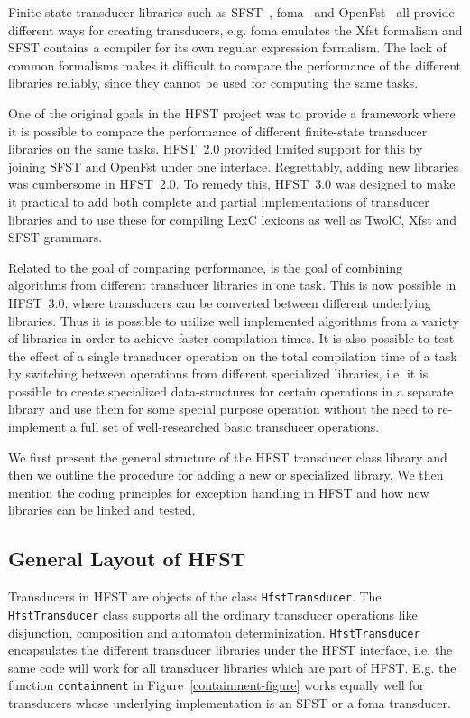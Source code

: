 \documentclass{llncs}
\begin{document}
Finite-state transducer libraries such as SFST~\cite{schmid/2005},
foma~\cite{hulden/2009} and OpenFst~\cite{openfst/2007} all provide
different ways for creating transducers, e.g. foma emulates the Xfst
formalism and SFST contains a compiler for its own regular expression
formalism. The lack of common formalisms makes it difficult to compare
the performance of the different libraries reliably, since they cannot
be used for computing the same tasks. 
 
One of the original goals in the HFST project was to provide a
framework where it is possible to compare the performance of different
finite-state transducer libraries on the same tasks. HFST~2.0 provided
limited support for this by joining SFST and OpenFst under one
interface. Regrettably, adding new libraries was cumbersome in HFST~2.0. 
To remedy this, HFST~3.0 was designed to make it practical to add both
complete and partial implementations of transducer libraries and to use
these for compiling LexC lexicons as well as TwolC, Xfst and SFST grammars.

Related to the goal of comparing performance, is the goal of combining
algorithms from different transducer libraries in one task. This is
now possible in HFST~3.0, where transducers can be converted between
different underlying libraries. Thus it is possible to utilize well
implemented algorithms from a variety of libraries in order to achieve
faster compilation times. It is also possible to test the effect of a
single transducer operation on the total compilation time of a task by
switching between operations from different specialized libraries, i.e. 
it is possible to create specialized data-structures for certain operations 
in a separate library and use them for some special purpose operation 
without the need to re-implement a full set of well-researched 
basic transducer operations.

We first present the general structure of the HFST transducer class library
and then we outline the procedure for adding a new or specialized library.
We then mention the coding principles for exception handling in HFST and
how new libraries can be linked and tested.

\subsection{General Layout of HFST}

Transducers in HFST are objects of the class {\tt HfstTransducer}. The
{\tt HfstTrans\-ducer} class supports all the ordinary transducer
operations like disjunction, composition and automaton determinization. 
{\tt HfstTransducer} encapsulates the different transducer
libraries under the HFST interface, i.e. the same code will work for all
transducer libraries which are part of HFST. E.g. the function {\tt containment} 
in Figure~\ref{containment-figure} works equally well for transducers whose 
underlying implementation is an SFST or a foma transducer.
\end{document}
